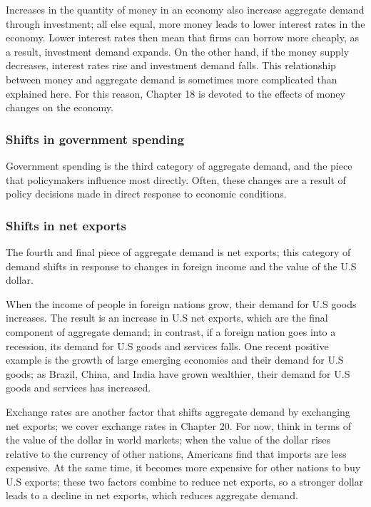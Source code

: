 \documentclass[11pt]{article} %
\begin{document}
Increases in the quantity of money in an economy also increase aggregate demand through investment; all else equal, more money leads to lower interest rates in the economy. Lower interest rates then mean that firms can borrow more cheaply, as a result, investment demand expands. On the other hand, if the money supply decreases, interest rates rise and investment demand falls. This relationship between money and aggregate demand is sometimes more complicated than explained here. For this reason, Chapter 18 is devoted to the effects of money changes on the economy.

\subsubsection*{Shifts in government spending}
Government spending is the third category of aggregate demand, and the piece that policymakers influence most directly. Often, these changes are a result of policy decisions made in direct response to economic conditions.

\subsubsection*{Shifts in net exports}
The fourth and final piece of aggregate demand is net exports; this category of demand shifts in response to changes in foreign income and the value of the U.S dollar.

When the income of people in foreign nations grow, their demand for U.S goods increases. The result is an increase in U.S net exports, which are the final component of aggregate demand; in contrast, if a foreign nation goes into a recession, its demand for U.S goods and services falls. One recent positive example is the growth of large emerging economies and their demand for U.S goods; as Brazil, China, and India have grown wealthier, their demand for U.S goods and services has increased.

Exchange rates are another factor that shifts aggregate demand by exchanging net exports; we cover exchange rates in Chapter 20. For now, think in terms of the value of the dollar in world markets; when the value of the dollar rises relative to the currency of other nations, Americans find that imports are less expensive. At the same time, it becomes more expensive for other nations to buy U.S exports; these two factors combine to reduce net exports, so a stronger dollar leads to a decline in net exports, which reduces aggregate demand.
\end{document}
